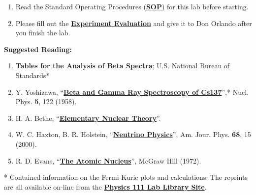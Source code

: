 \documentclass{../lab}
\begin{document}
\begin{enumerate}
    \item Read the Standard Operating Procedures (\href{http://experimentationlab.berkeley.edu/sites/default/files/images/SOP\_3271\_Cs-137\_Na-22\_Co-60\_Mn-54\_Am-241\_Fe-55\_2014.pdf}{\textbf{SOP}}) for this lab before starting.

    \item Please fill out the \href{\ExperimentEvaluation}{\textbf{Experiment Evaluation}} and give it to Don Orlando after you finish the lab.

\end{enumerate}

\textbf{Suggested Reading:}

\begin{enumerate}
    \item \href{http://physics111.lib.berkeley.edu/Physics111/Reprints/BRA/04-Table\_for\_Analysis\_of\_Beta\_Spectra.pdf}{\textbf{Tables for the Analysis of Beta Spectra}}; U.S. National Bureau of Standards*

    \item Y. Yoshizawa, ``\href{http://physics111.lib.berkeley.edu/Physics111/Reprints/BRA/Yoshizawa_beta&gammarayspecofCs137.pdf}{\textbf{Beta and Gamma Ray Spectroscopy of Cs137}}'',* Nucl. Phys. \textbf{5}, 122 (1958).

    \item H. A. Bethe, ``\href{http://physics111.lib.berkeley.edu/Physics111/Reprints/BRA/05-Elementary\_Nuclear\_Theory.pdf}{\textbf{Elementary Nuclear Theory}}''.

    \item W. C. Haxton, B. R. Holstein, ``\href{http://physics111.lib.berkeley.edu/Physics111/Reprints/BRA/BRA(state\%20of\%20the\%20science\%20and\%20art\%20of\%20beta\%20decay_OCR\%20.pdf}{\textbf{Neutrino Physics}}'', Am. Jour. Phys. \textbf{68}, 15 (2000).

    \item R. D. Evans, ``\href{http://physics111.lib.berkeley.edu/Physics111/Reprints/R.D.Evans\%20Atomic\%20Nucleus/The\%20Atomic\%20Nucleus\%20Evans\%20full\%20text.pdf}{\textbf{The Atomic Nucleus}}'', McGraw Hill (1972).

\end{enumerate}

* Contained information on the Fermi-Kurie plots and calculations. The reprints are all available on-line from the \href{http://physics111.lib.berkeley.edu/Physics111/Reprints/BRA/BRA\_index.html}{\textbf{Physics 111 Lab Library Site}}.
\end{document}
